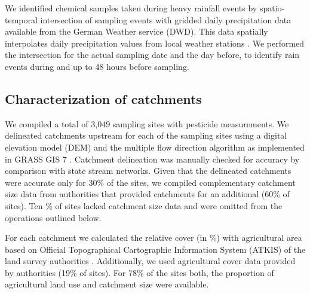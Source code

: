 \documentclass[journal=esthag,manuscript=article]{achemso}
\begin{document}
We identified chemical samples taken during heavy rainfall events by spatio-temporal intersection of sampling events with gridded daily precipitation data available from the German Weather service (DWD).
This data spatially interpolates daily precipitation values from local weather stations \citep{rauthe_central_2013}. 
We performed the intersection for the actual sampling date and the day before, to identify rain events during and up to 48 hours before sampling.

\subsection{Characterization of catchments}
We compiled a total of 3,049 sampling sites with pesticide measurements.
We delineated catchments upstream for each of the sampling sites using a digital elevation model (DEM) \citep{eea_digital_2013} and the multiple flow direction algorithm \citep{holmgren_multiple_1994} as implemented in GRASS GIS 7 \citep{neteler_grass_2012}.
Catchment delineation was manually checked for accuracy by comparison with state stream networks.
Given that the delineated catchments were accurate only for 30\% of the sites,
we compiled complementary catchment size data from authorities that provided catchments for an additional (60\% of sites). Ten \% of sites lacked catchment size data and were omitted from the operations outlined below.

For each catchment we calculated the relative cover (in \%) with agricultural area based on Official Topographical Cartographic Information System (ATKIS) of the land survey authorities \citep{adv_atkis_2016}.
Additionally, we used agricultural cover data provided by authorities (19\% of sites). 
For 78\% of the sites both, the proportion of agricultural land use and catchment size were available.
\end{document}
